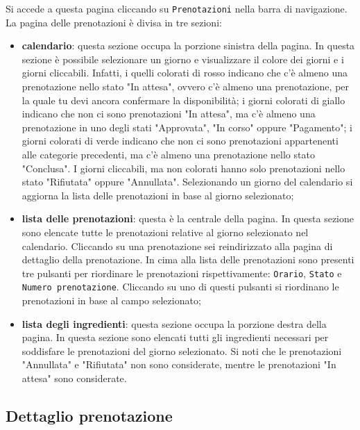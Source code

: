 Si accede a questa pagina cliccando su \texttt{Prenotazioni} nella barra di
navigazione. La pagina delle prenotazioni è divisa in tre sezioni:
\begin{itemize}
	\item \textbf{calendario}: questa sezione occupa la porzione sinistra della
		pagina. In questa sezione è possibile selezionare un giorno e
		visualizzare il colore dei giorni e i giorni cliccabili. Infatti, i
		quelli colorati di rosso indicano che c'è almeno una prenotazione nello
		stato "In attesa", ovvero c'è almeno una prenotazione, per la quale tu
		devi ancora confermare la disponibilità; i giorni colorati di giallo
		indicano che non ci sono prenotazioni "In attesa", ma c'è almeno una
		prenotazione in uno degli stati "Approvata", "In corso" oppure
		"Pagamento"; i giorni colorati di verde indicano che non ci sono
		prenotazioni appartenenti alle categorie precedenti, ma c'è almeno una
		prenotazione nello stato "Conclusa". I giorni cliccabili, ma non
		colorati hanno solo prenotazioni nello stato "Rifiutata" oppure
		"Annullata". Selezionando un giorno del calendario si aggiorna la lista
		delle prenotazioni in base al giorno selezionato;

	\item \textbf{lista delle prenotazioni}: questa è la centrale della pagina.
		In questa sezione sono elencate tutte le prenotazioni relative al giorno
		selezionato nel calendario. Cliccando su una prenotazione sei
		reindirizzato alla pagina di dettaglio della prenotazione. In cima alla
		lista delle prenotazioni sono presenti tre pulsanti per riordinare le
		prenotazioni rispettivamente: \texttt{Orario}, \texttt{Stato} e
		\texttt{Numero prenotazione}. Cliccando su uno di questi pulsanti si
		riordinano le prenotazioni in base al campo selezionato;

	\item \textbf{lista degli ingredienti}: questa sezione occupa la porzione
		destra della pagina. In questa sezione sono elencati tutti gli
		ingredienti necessari per soddisfare le prenotazioni del giorno
		selezionato. Si noti che le prenotazioni "Annullata" e "Rifiutata" non
		sono considerate, mentre le prenotazioni "In attesa" sono considerate.
\end{itemize}

\subsection{Dettaglio prenotazione}

